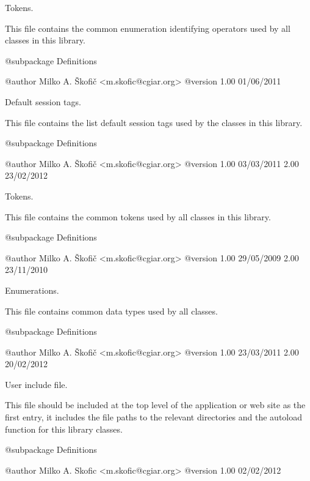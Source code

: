 Tokens.

This file contains the common enumeration identifying operators used by all classes in this library.

\begin{DoxyVerb}    @subpackage     Definitions

    @author         Milko A. Škofič <m.skofic@cgiar.org>
    @version        1.00 01/06/2011\end{DoxyVerb}


Default session tags.

This file contains the list default session tags used by the classes in this library.

\begin{DoxyVerb}    @subpackage     Definitions

    @author         Milko A. Škofič <m.skofic@cgiar.org>
    @version        1.00 03/03/2011
                            2.00 23/02/2012\end{DoxyVerb}


Tokens.

This file contains the common tokens used by all classes in this library.

\begin{DoxyVerb}    @subpackage     Definitions

    @author         Milko A. Škofič <m.skofic@cgiar.org>
    @version        1.00 29/05/2009
                            2.00 23/11/2010\end{DoxyVerb}


Enumerations.

This file contains common data types used by all classes.

\begin{DoxyVerb}    @subpackage     Definitions

    @author         Milko A. Škofič <m.skofic@cgiar.org>
    @version        1.00 23/03/2011
                            2.00 20/02/2012\end{DoxyVerb}


User include file.

This file should be included at the top level of the application or web site as the first entry, it includes the file paths to the relevant directories and the autoload function for this library classes.

\begin{DoxyVerb}    @subpackage     Definitions

    @author         Milko A. Skofic <m.skofic@cgiar.org>
    @version        1.00 02/02/2012\end{DoxyVerb}
 